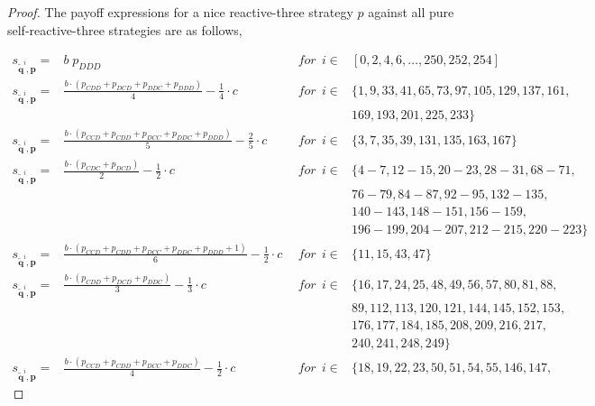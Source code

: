 \documentclass{article}
\theoremstyle{definition}
\begin{document}
\begin{proof}
The payoff expressions for a nice reactive-three strategy $p$ against all
pure self-reactive-three strategies are as follows,

\small{
\begin{equation}\label{Eq:PayoffExpressionsReactiveThree}
\begin{array}{lcll}
  s_{\mathbf{\tilde{q}}^{i}, \mathbf{p}} = & b \; p_{DDD} & ~~for~~ i \in & [0, 2, 4, 6, \dots, 250, 252, 254] \\ [0.1cm]
    s_{\mathbf{\tilde{q}}^{i}, \mathbf{p}} = & \frac{b \cdot (p_{CDD} + p_{DCD} + p_{DDC} + p_{DDD})}{4} - \frac{1}{4} \cdot c & ~~for~~ i \in & \{ 1, 9, 33, 41, 65, 73, 97, 105, 129, 137, 161,
    \\ & & &  169, 193, 201, 225, 233\} \\ [0.1cm]
    s_{\mathbf{\tilde{q}}^{i}, \mathbf{p}} = & \frac{b \cdot \left(p_{CCD} + p_{CDD} + p_{DCC} + p_{DDC} + p_{DDD}\right)}{5} - \frac{2}{5} \cdot c & ~~for~~ i \in & \{ 3, 7, 35, 39, 131, 135, 163, 167\} \\ [0.2cm]
    s_{\mathbf{\tilde{q}}^{i}, \mathbf{p}} = & \frac{b \cdot \left(p_{CDC} + p_{DCD}\right)}{2} - \frac{1}{2} \cdot c & ~~for~~ i \in & \{ 4 \!- \!7, 12 \!- \!15, 20 \!- \!23, 28 \!- \!31, 68 \!- \!71,
    \\ & & &  76 \!- \!79, 84 \!- \!87, 92 \!- \!95, 132 \!- \!135, 
    \\ & & & 140 \!- \!143, 148- 151, 156 \!- \!159, 
    \\ & & & 196 \!- \!199, 204 \!- \!207, 212 \!- \!215, 220 \!- \!223\} \\ 
    s_{\mathbf{\tilde{q}}^{i}, \mathbf{p}} = & \frac{b \cdot \left(p_{CCD} + p_{CDD} + p_{DCC} + p_{DDC} + p_{DDD} + 1\right)}{6} - \frac{1}{2} \cdot c & ~~for~~ i \in & \{ 11, 15, 43, 47\} \\ [0.2cm]
    s_{\mathbf{\tilde{q}}^{i}, \mathbf{p}} = & \frac{b \cdot \left(p_{CDD} + p_{DCD} + p_{DDC}\right)}{3} - \frac{1}{3} \cdot c & ~~for~~ i \in & \{ 16,17,24,25,48,49,56,57,80,81,88,
    \\ & & & 89,112, 113,120,121, 144,145,152,153,
    \\ & & & 176,177,184,185,208,209,216,217,
    \\ & & & 240, 241,248,249\} \\ 
    s_{\mathbf{\tilde{q}}^{i}, \mathbf{p}} = & \frac{b \cdot \left(p_{CCD} + p_{CDD} + p_{DCC} + p_{DDC}\right)}{4} - \frac{1}{2} \cdot c & ~~for~~ i \in & \{ 18, 19, 22, 23, 50, 51, 54, 55, 146, 147,

\end{array}
\end{equation}}
\end{proof}
\end{document}
